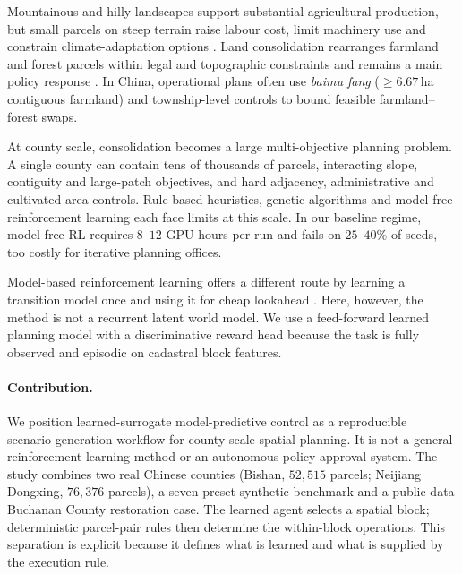 \documentclass[11pt]{article}
\begin{document}
Mountainous and hilly landscapes support substantial agricultural production, but small parcels on steep terrain raise labour cost, limit machinery use and constrain climate-adaptation options \citep{romeo2020fao,liu2023fragmentation,niu2023fragmentation,foley2011solutions,springmann2018options}. Land consolidation rearranges farmland and forest parcels within legal and topographic constraints and remains a main policy response \citep{liu2014land,long2014rural,rounsevell2014challenges}. In China, operational plans often use \textit{baimu fang} ($\geq 6.67$\,ha contiguous farmland) and township-level controls to bound feasible farmland--forest swaps.

At county scale, consolidation becomes a large multi-objective planning problem. A single county can contain tens of thousands of parcels, interacting slope, contiguity and large-patch objectives, and hard adjacency, administrative and cultivated-area controls. Rule-based heuristics, genetic algorithms \citep{cao2012boundary,deb2002fast,stewart2004multi,aerts2002using} and model-free reinforcement learning \citep{zheng2023urban,equihua2024connectivity,janowicz2020geoai} each face limits at this scale. In our baseline regime, model-free RL requires $8$--$12$ GPU-hours per run and fails on $25$--$40\%$ of seeds, too costly for iterative planning offices.

Model-based reinforcement learning offers a different route by learning a transition model once and using it for cheap lookahead \citep{chua2018deep,janner2019trust}. Here, however, the method is not a recurrent latent world model. We use a feed-forward learned planning model with a discriminative reward head because the task is fully observed and episodic on cadastral block features.

\paragraph{Contribution.} We position learned-surrogate model-predictive control as a reproducible scenario-generation workflow for county-scale spatial planning. It is not a general reinforcement-learning method or an autonomous policy-approval system. The study combines two real Chinese counties (Bishan, $52{,}515$ parcels; Neijiang Dongxing, $76{,}376$ parcels), a seven-preset synthetic benchmark and a public-data Buchanan County restoration case. The learned agent selects a spatial block; deterministic parcel-pair rules then determine the within-block operations. This separation is explicit because it defines what is learned and what is supplied by the execution rule.
\end{document}
